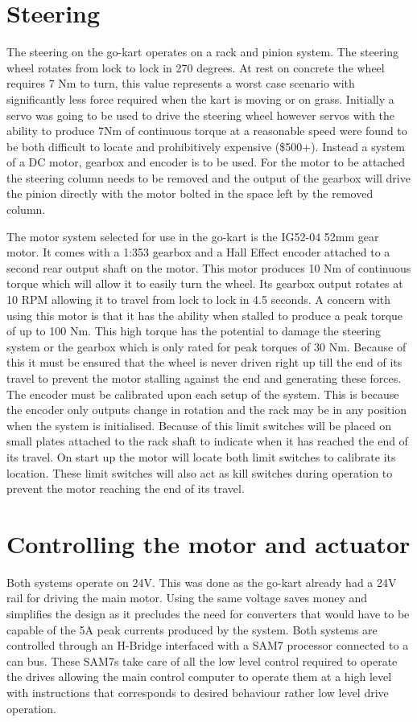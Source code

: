 \section*{Steering}
The steering on the go-kart operates on a rack and pinion system. The steering wheel rotates from lock to lock in 270 degrees. At rest on concrete the wheel requires 7 Nm to turn, this value represents a worst case scenario with significantly less force required when the kart is moving or on grass. Initially a servo was going to be used to drive the steering wheel however servos with the ability to produce 7Nm of continuous torque at a reasonable speed were found to be both difficult to locate and prohibitively expensive (\$500+). Instead a system of a DC motor, gearbox and encoder is to be used. For the motor to be attached the steering column needs to be removed and the output of the gearbox will drive the pinion directly with the motor bolted in the space left by the removed column. %

The motor system selected for use in the go-kart is the IG52-04 52mm gear motor. It comes with a 1:353 gearbox and a Hall Effect encoder attached to a second rear output shaft on the motor. This motor produces 10 Nm of continuous torque which will allow it to easily turn the wheel. Its gearbox output rotates at 10 RPM allowing it to travel from lock to lock in 4.5 seconds. A concern with using this motor is that it has the ability when stalled to produce a peak torque of up to 100 Nm. This high torque has the potential to damage the steering system or the gearbox which is only rated for peak torques of 30 Nm. Because of this it must be ensured that the wheel is never driven right up till the end of its travel to prevent the motor stalling against the end and generating these forces. The encoder must be calibrated upon each setup of the system. This is because the encoder only outputs change in rotation and the rack may be in any position when the system is initialised. Because of this limit switches will be placed on small plates attached to the rack shaft to indicate when it has reached the end of its travel. On start up the motor will locate both limit switches to calibrate its location. These limit switches will also act as kill switches during operation to prevent the motor reaching the end of its travel.

\section*{Controlling the motor and actuator}
Both systems operate on 24V. This was done as the go-kart already had a 24V rail for driving the main motor. Using the same voltage saves money and simplifies the design as it precludes the need for converters that would have to be capable of the 5A peak currents produced by the system. Both systems are controlled through an H-Bridge interfaced with a SAM7 processor connected to a can bus. These SAM7s take care of all the low level control required to operate the drives allowing the main control computer to operate them at a high level with instructions that corresponds to desired behaviour rather low level drive operation.

